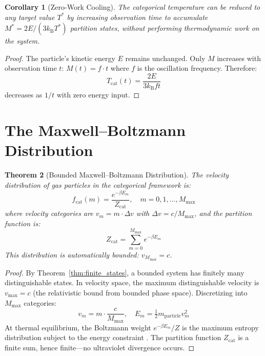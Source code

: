 \documentclass[twocolumn,10pt,a4paper]{article}
\theoremstyle{plain}
\newtheorem{theorem}{Theorem}[section]
\newtheorem{corollary}[theorem]{Corollary}
\theoremstyle{definition}
\theoremstyle{remark}
\newcommand{\kB}{k_{\mathrm{B}}}
\begin{document}
\begin{corollary}[Zero-Work Cooling]
\label{cor:zero_work}
The categorical temperature can be reduced to any target value $T^*$ by increasing observation time to accumulate $M^* = 2E/(3\kB T^*)$ partition states, without performing thermodynamic work on the system.
\end{corollary}

\begin{proof}
The particle's kinetic energy $E$ remains unchanged. Only $M$ increases with observation time $t$: $M(t) = f \cdot t$ where $f$ is the oscillation frequency. Therefore:
\begin{equation}
    T_{\mathrm{cat}}(t) = \frac{2E}{3\kB f t}
\end{equation}
decreases as $1/t$ with zero energy input.
\end{proof}

\section{The Maxwell--Boltzmann Distribution}
\label{sec:maxwell}

\begin{theorem}[Bounded Maxwell--Boltzmann Distribution]
\label{thm:maxwell}
The velocity distribution of gas particles in the categorical framework is:
\begin{equation}
    f_{\mathrm{cat}}(m) = \frac{e^{-\beta E_m}}{Z_{\mathrm{cat}}}, \quad m = 0, 1, \ldots, M_{\max}
\end{equation}
where velocity categories are $v_m = m \cdot \Delta v$ with $\Delta v = c/M_{\max}$, and the partition function is:
\begin{equation}
    Z_{\mathrm{cat}} = \sum_{m=0}^{M_{\max}} e^{-\beta E_m}
\end{equation}
This distribution is automatically bounded: $v_{M_{\max}} = c$.
\end{theorem}

\begin{proof}
By Theorem~\ref{thm:finite_states}, a bounded system has finitely many distinguishable states. In velocity space, the maximum distinguishable velocity is $v_{\max} = c$ (the relativistic bound from bounded phase space). Discretizing into $M_{\max}$ categories:
\begin{equation}
    v_m = m \cdot \frac{c}{M_{\max}}, \quad E_m = \tfrac{1}{2}m_{\mathrm{particle}} v_m^2
\end{equation}
At thermal equilibrium, the Boltzmann weight $e^{-\beta E_m}/Z$ is the maximum entropy distribution subject to the energy constraint \cite{jaynes1957}. The partition function $Z_{\mathrm{cat}}$ is a finite sum, hence finite---no ultraviolet divergence occurs.
\end{proof}
\end{document}
